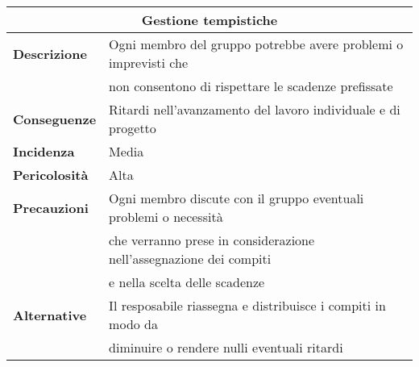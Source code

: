 \begin{center}
    \begin{tabularx}{0.8\linewidth}{l|l}
        \multicolumn{2}{c}{\textbf{Gestione tempistiche}}                                                      \\
        \hline{\textbf{Descrizione}}    & Ogni membro del gruppo potrebbe avere problemi o imprevisti che      \\
                                        & non consentono di rispettare le scadenze prefissate                  \\                                 
        \textbf{Conseguenze}            & Ritardi nell'avanzamento del lavoro individuale e di progetto        \\
        \textbf{Incidenza}              & Media                                                                \\
        \textbf{Pericolosità}           & Alta                                                                 \\
        \textbf{Precauzioni}            & Ogni membro discute con il gruppo eventuali problemi o necessità     \\
                                        & che verranno prese in considerazione nell'assegnazione dei compiti   \\
                                        & e nella scelta delle scadenze                                        \\
        \textbf{Alternative}            & Il resposabile riassegna e distribuisce i compiti in modo da         \\ 
                                        & diminuire o rendere nulli eventuali ritardi                          \\ 
    \end{tabularx}
\end{center}


